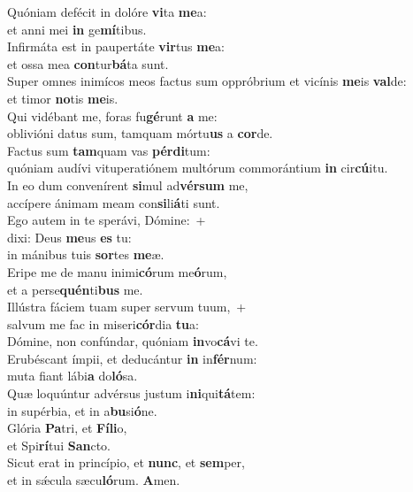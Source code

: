 \evenverse Quóniam defécit in dolóre \textbf{vi}ta \textbf{me}a:~\*\\
\evenverse et anni mei \textbf{in} ge\textbf{mí}tibus.\\
\oddverse Infirmáta est in paupertáte \textbf{vir}tus \textbf{me}a:~\*\\
\oddverse et ossa mea \textbf{con}tur\textbf{bá}ta sunt.\\
\evenverse Super omnes inimícos meos factus sum oppróbrium et vicínis \textbf{me}is \textbf{val}de:~\*\\
\evenverse et timor \textbf{no}tis \textbf{me}is.\\
\oddverse Qui vidébant me, foras fu\textbf{gé}runt \textbf{a} me:~\*\\
\oddverse oblivióni datus sum, tamquam mórtu\textbf{us} a \textbf{cor}de.\\
\evenverse Factus sum \textbf{tam}quam vas \textbf{pér}\textbf{di}tum:~\*\\
\evenverse quóniam audívi vituperatiónem multórum commorántium \textbf{in} cir\textbf{cú}itu.\\
\oddverse In eo dum convenírent \textbf{si}mul ad\textbf{vér}\textbf{sum} me,~\*\\
\oddverse accípere ánimam meam con\textbf{si}li\textbf{á}ti sunt.\\
\evenverse Ego autem in te sperávi, Dómine:~+\\
\evenverse  dixi: Deus \textbf{me}us \textbf{es} tu:~\*\\
\evenverse in mánibus tuis \textbf{sor}tes \textbf{me}æ.\\
\oddverse Eripe me de manu inimi\textbf{có}rum me\textbf{ó}rum,~\*\\
\oddverse et a perse\textbf{quén}ti\textbf{bus} me.\\
\evenverse Illústra fáciem tuam super servum tuum,~+\\
\evenverse  salvum me fac in miseri\textbf{cór}dia \textbf{tu}a:~\*\\
\evenverse Dómine, non confúndar, quóniam \textbf{in}vo\textbf{cá}vi te.\\
\oddverse Erubéscant ímpii, et deducántur \textbf{in} in\textbf{fér}num:~\*\\
\oddverse muta fiant lábi\textbf{a} do\textbf{ló}sa.\\
\evenverse Quæ loquúntur advérsus justum i\textbf{ni}qui\textbf{tá}tem:~\*\\
\evenverse in supérbia, et in a\textbf{bu}si\textbf{ó}ne.\\
\oddverse Glória \textbf{Pa}tri, et \textbf{Fí}\textbf{li}o,~\*\\
\oddverse et Spi\textbf{rí}tui \textbf{San}cto.\\
\evenverse Sicut erat in princípio, et \textbf{nunc}, et \textbf{sem}per,~\*\\
\evenverse et in sǽcula sæcu\textbf{ló}rum. \textbf{A}men.\\
